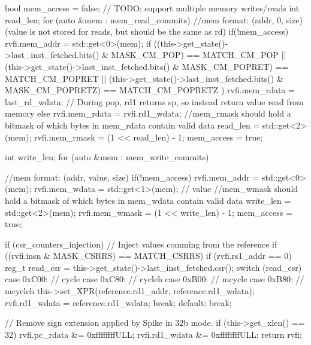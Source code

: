\begin{clisting}
{  bool mem_access = false; // TODO: support multiple memory writes/reads
  int read_len;
  for (auto &mem : mem_read_commits) {
    //mem format: (addr, 0, size) (value is not stored for reads, but should be the same as rd)
    if(!mem_access) {
      rvfi.mem_addr = std::get<0>(mem);
      if ((this->get_state()->last_inst_fetched.bits() & MASK_CM_POP) == MATCH_CM_POP         ||
          (this->get_state()->last_inst_fetched.bits() & MASK_CM_POPRET) == MATCH_CM_POPRET   ||
          (this->get_state()->last_inst_fetched.bits() & MASK_CM_POPRETZ) == MATCH_CM_POPRETZ ){    
        rvfi.mem_rdata = last_rd_wdata; // During pop, rd1 returns sp, so instead return value read from memory 
      } else {
        rvfi.mem_rdata = rvfi.rd1_wdata; 
      }
      //mem_rmask should hold a bitmask of which bytes in mem_rdata contain valid data
      read_len = std::get<2>(mem);
      rvfi.mem_rmask = (1 << read_len) - 1;
      mem_access = true;
    }
  }

  int write_len;
  for (auto &mem : mem_write_commits) {
    //mem format: (addr, value, size)
    if(!mem_access) {
      rvfi.mem_addr = std::get<0>(mem);
      rvfi.mem_wdata = std::get<1>(mem); // value
      //mem_wmask should hold a bitmask of which bytes in mem_wdata contain valid data
      write_len = std::get<2>(mem);
      rvfi.mem_wmask = (1 << write_len) - 1;
      mem_access = true;
    }

  }
  
  if (csr_counters_injection) {
    // Inject values comming from the reference
    if ((rvfi.insn & MASK_CSRRS) == MATCH_CSRRS) {
      if (rvfi.rs1_addr == 0) {
        reg_t read_csr = this->get_state()->last_inst_fetched.csr();
        switch (read_csr) {
        case 0xC00: // cycle
        case 0xC80: // cycleh
        case 0xB00: // mcycle
        case 0xB80: // mcycleh
          this->set_XPR(reference.rd1_addr, reference.rd1_wdata);
          rvfi.rd1_wdata = reference.rd1_wdata;
          break;
        default:
          break;
        }
      }
    }
  }

  // Remove sign extension applied by Spike in 32b mode.
  if (this->get_xlen() == 32) {
    rvfi.pc_rdata &= 0xffffffffULL;
    rvfi.rd1_wdata &= 0xffffffffULL;
  }
  return rvfi;
}

\end{clisting}

